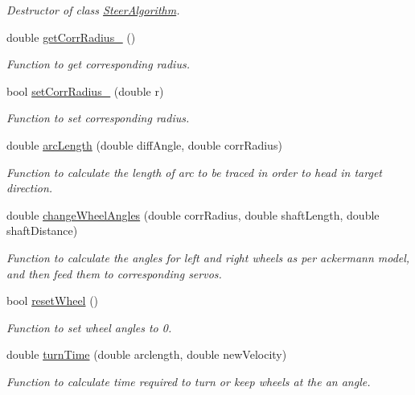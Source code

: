 \begin{DoxyCompactItemize}
\begin{DoxyCompactList}\small\item\em Destructor of class \hyperlink{class_steer_algorithm}{Steer\+Algorithm}. \end{DoxyCompactList}\item 
double \hyperlink{class_steer_algorithm_a06a7dd049280fab40d1b54c912daf399}{get\+Corr\+Radius\+\_\+} ()
\begin{DoxyCompactList}\small\item\em Function to get corresponding radius. \end{DoxyCompactList}\item 
bool \hyperlink{class_steer_algorithm_a93cf1fc7d06376ddeaa4e81f2b0a22cc}{set\+Corr\+Radius\+\_\+} (double r)
\begin{DoxyCompactList}\small\item\em Function to set corresponding radius. \end{DoxyCompactList}\item 
double \hyperlink{class_steer_algorithm_a17ff78af17e900f752237d274bcf751d}{arc\+Length} (double diff\+Angle, double corr\+Radius)
\begin{DoxyCompactList}\small\item\em Function to calculate the length of arc to be traced in order to head in target direction. \end{DoxyCompactList}\item 
double \hyperlink{class_steer_algorithm_a6067af69593713f561890ae8ad23f5ff}{change\+Wheel\+Angles} (double corr\+Radius, double shaft\+Length, double shaft\+Distance)
\begin{DoxyCompactList}\small\item\em Function to calculate the angles for left and right wheels as per ackermann model, and then feed them to corresponding servos. \end{DoxyCompactList}\item 
bool \hyperlink{class_steer_algorithm_ab251b6fd1f88fb7a526b0d55cd12625b}{reset\+Wheel} ()
\begin{DoxyCompactList}\small\item\em Function to set wheel angles to 0. \end{DoxyCompactList}\item 
double \hyperlink{class_steer_algorithm_aefdb433f65c47bf6e0d6af5de98c8f5a}{turn\+Time} (double arclength, double new\+Velocity)
\begin{DoxyCompactList}\small\item\em Function to calculate time required to turn or keep wheels at the an angle. \end{DoxyCompactList}\end{DoxyCompactItemize}


